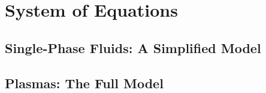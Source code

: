 \section{System of Equations}

    
    \subsection*{Single-Phase Fluids: A Simplified Model}


    \subsection*{Plasmas: The Full Model}
        